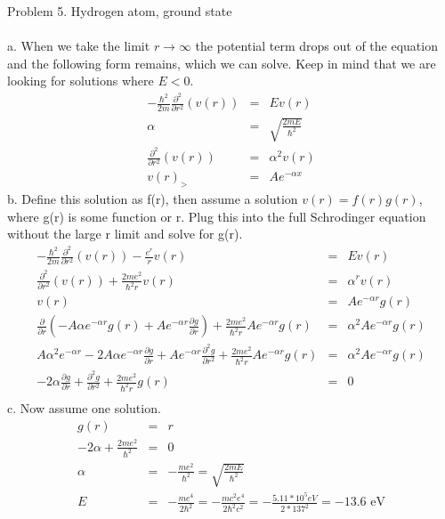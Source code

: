 \documentclass[11pt]{amsart}
\begin{document}
Problem 5.  Hydrogen atom, ground state  \\ \\
a. When we take the limit $r\rightarrow\infty$ the potential term drops out of the equation and the following form remains, which we can solve. Keep in mind that we are looking for solutions where $E<0$. \\
\begin{eqnarray*}
-\frac{\hbar^{2}}{2m}\frac{\partial^{2}}{\partial{r}^{2}}(v(r)) &=& Ev(r) \\
\alpha &=& \sqrt{\frac{2mE}{\hbar^{2}}} \\
\frac{\partial^{2}}{\partial{r}^{2}}(v(r)) &=& \alpha^{2}v(r) \\
v(r)_{>} &=& Ae^{-\alpha{x}} 
\end{eqnarray*}
b. Define this solution as f(r), then assume a solution $v(r)=f(r)g(r)$, where g(r) is some function or r. Plug this into the full Schrodinger equation without the large r limit and solve for g(r). \\
\begin{eqnarray*} 
-\frac{\hbar^{2}}{2m}\frac{\partial^{2}}{\partial{r}^{2}}(v(r))-\frac{e^{r}}{r}v(r) &=& Ev(r) \\
\frac{\partial^{2}}{\partial{r}^{2}}(v(r))+\frac{2me^{2}}{\hbar^{2}r}v(r) &=& \alpha^{r}v(r) \\
v(r) &=& Ae^{-\alpha{r}}g(r) \\
\frac{\partial}{\partial{r}}(-A\alpha{}e^{-\alpha{r}}g(r)+Ae^{-\alpha{r}}\frac{\partial{g}}{\partial{r}})+\frac{2me^{2}}{\hbar^{2}r}Ae^{-\alpha{r}}g(r) &=& \alpha^{2}Ae^{-\alpha{r}}g(r) \\
A\alpha^{2}e^{-\alpha{r}}-2A\alpha{}e^{-\alpha{r}}\frac{\partial{g}}{\partial{r}}+Ae^{-\alpha{r}}\frac{\partial^{2}g}{\partial{r}^{2}}+\frac{2me^{2}}{\hbar^{2}r}Ae^{-\alpha{r}}g(r) &=& \alpha^{2}Ae^{-\alpha{r}}g(r) \\
-2\alpha{}\frac{\partial{g}}{\partial{r}}+\frac{\partial^{2}g}{\partial{r}^{2}}+\frac{2me^{2}}{\hbar^{2}r}g(r) &=& 0 \\
\end{eqnarray*} 
c. Now assume one solution. \\
\begin{eqnarray*} 
g(r) &=& r \\
-2\alpha+\frac{2me^{2}}{\hbar^{2}} &=& 0 \\
\alpha &=& -\frac{me^{2}}{\hbar^{2}} = \sqrt{\frac{2mE}{\hbar^{2}}} \\
E &=& -\frac{me^{4}}{2\hbar^{2}} = -\frac{mc^{2}e^{4}}{2\hbar^{2}c^{2}} = -\frac{5.11*10^{5}eV}{2*137^{2}} = -13.6\mbox{ eV} 
\end{eqnarray*} 
\end{document}
